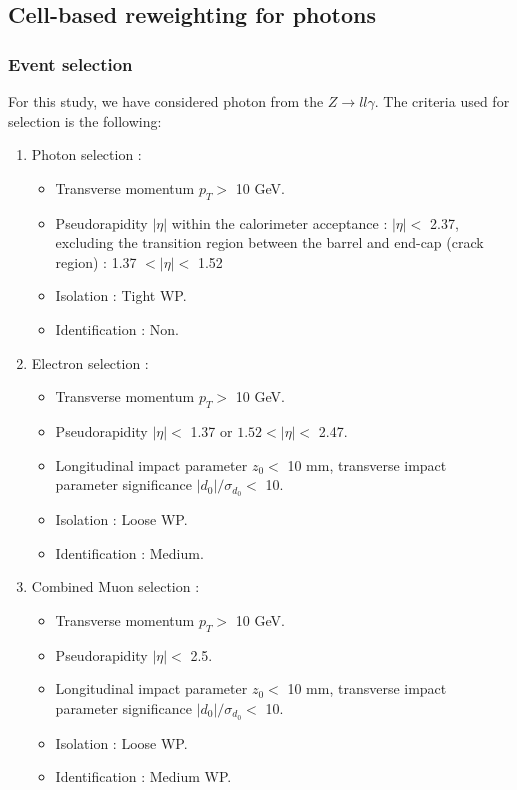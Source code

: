 \subsection{Cell-based reweighting for photons}
\label{gamma:ss:reweighting:photon}
\subsubsection{Event selection}
\label{gamma:ss:reweighting:photon:RadZSel}
For this study, we have considered photon from the $Z\rightarrow ll\gamma$. The criteria used for selection is the following:
\begin{enumerate}
    \item Photon selection :  
    \begin{itemize}
    \item Transverse momentum $p_T > $  10 GeV.
    \item Pseudorapidity $|\eta|$ within the calorimeter acceptance : $|\eta| < $ 2.37, excluding the transition region between the barrel and end-cap (crack region) : 1.37 $ < |\eta| < $ 1.52
    \item Isolation : Tight WP.
    \item Identification : Non. 
\end{itemize}
    \item Electron selection :
    \begin{itemize}
        \item Transverse momentum $p_T > $ 10 GeV.
        \item Pseudorapidity $|\eta| < $ 1.37 or $1.52 < |\eta| < $ 2.47.
        \item Longitudinal impact parameter $z_0 < $ 10 mm, transverse impact parameter significance $|d_0|/\sigma_{d_0} < $ 10.
        \item Isolation : Loose WP.
        \item Identification : Medium.
    \end{itemize}
    \item Combined Muon selection : 
    \begin{itemize}
        \item Transverse momentum $p_T > $ 10 GeV.
        \item Pseudorapidity $|\eta| < $ 2.5.
        \item Longitudinal impact parameter $z_0 < $ 10 mm, transverse impact parameter significance $|d_0|/\sigma_{d_0} < $ 10.
        \item Isolation : Loose WP.
        \item Identification : Medium WP.

\end{itemize}
\end{enumerate}
